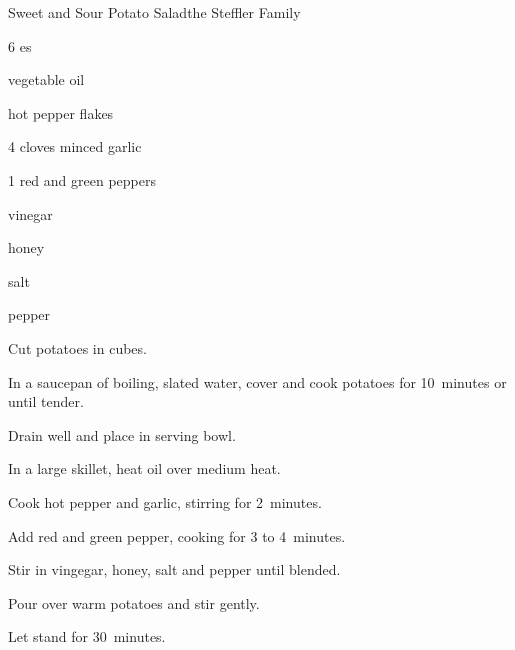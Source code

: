 \begin{recipe}{Sweet and Sour Potato Salad}{the Steffler Family}{}

\begin{ingredients}
\item 6 es
\item {} vegetable oil
\item hot pepper flakes
\item 4 cloves minced garlic
\item 1 red and green peppers
\item \C{\third} vinegar
\item {} honey
\item \tp{\half} salt
\item \tp{\half} pepper
\end{ingredients}

\begin{directions}
\item Cut potatoes in  cubes.
\item In a saucepan of boiling, slated water, cover and cook potatoes for 10~minutes or until tender.
\item Drain well and place in serving bowl.
\item In a large skillet, heat oil over medium heat.
\item Cook hot pepper and garlic, stirring for 2~minutes.
\item Add red and green pepper, cooking for 3 to 4~minutes.
\item Stir in vingegar, honey, salt and pepper until blended.
\item Pour over warm potatoes and stir gently.
\item Let stand for 30~minutes.
\end{directions}
\end{recipe}
